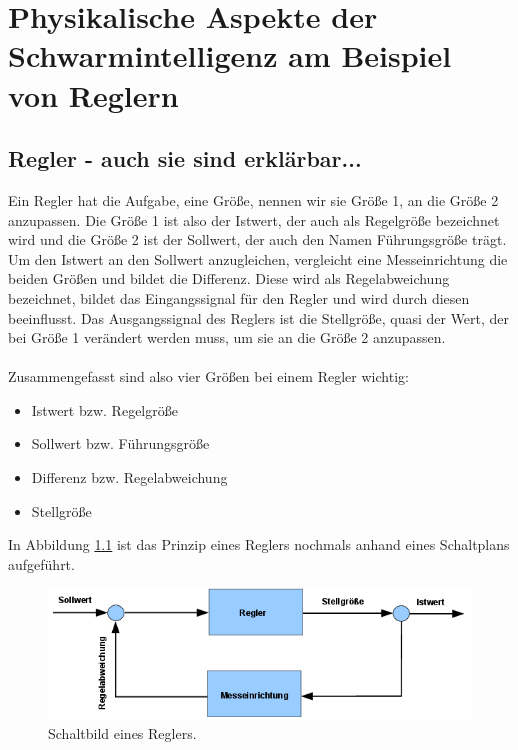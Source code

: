 \chapter{Physikalische Aspekte der Schwarmintelligenz am Beispiel von Reglern}

\section{Regler - auch sie sind erklärbar...}

Ein Regler hat die Aufgabe, eine Größe, nennen wir sie Größe 1, an die Größe 2 anzupassen. Die Größe 1 ist also der Istwert, der auch als Regelgröße bezeichnet wird und die Größe 2 ist der Sollwert, der auch den Namen Führungsgröße trägt. 
\\Um den Istwert an den Sollwert anzugleichen, vergleicht eine Messeinrichtung die beiden Größen und bildet die Differenz. Diese wird als Regelabweichung bezeichnet, bildet das Eingangssignal für den Regler und wird durch diesen beeinflusst. Das Ausgangssignal des Reglers ist die Stellgröße, quasi der Wert, der bei Größe 1 verändert werden muss, um sie an die Größe 2 anzupassen.\\
\\
Zusammengefasst sind also vier Größen bei einem Regler wichtig:
\begin{itemize}
\item Istwert bzw. Regelgröße
\item Sollwert bzw. Führungsgröße
\item Differenz bzw. Regelabweichung
\item Stellgröße
\end{itemize}
In Abbildung \ref{fig:Bild1} ist das Prinzip eines Reglers nochmals anhand eines Schaltplans aufgeführt. 

\begin{figure}[htb]
\centering 
\includegraphics[width=1.05\textwidth]{images/Bild1} 
\vspace{0.2cm}
\caption{Schaltbild eines Reglers.}
\label{fig:Bild1}
\end{figure} 


